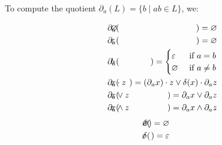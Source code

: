 \documentclass[sigplan,review,acmsmall,nonacm,screen,anonymous]{acmart}\settopmatter{printfolios=false,printccs=false,printacmref=false}
\begin{document}
\begin{definition}[Brzozowski, 1964]
  To compute the quotient \(\partial_a(L) = \{b \mid ab \in L\}\), we:

  \vspace{-0.8cm}
  \begin{multicols}{2}
    \begin{eqnarray*}
      \phantom{--}\partial_a(&\hspace{-0.35cm} \varnothing \hspace{-0.35cm}&) = \varnothing                                           \\
      \phantom{--}\partial_a(&\hspace{-0.35cm} \varepsilon \hspace{-0.35cm}&) = \varnothing                                           \\
      \phantom{--}\partial_a(&\hspace{-0.35cm} b           \hspace{-0.35cm}&) = \begin{cases}\varepsilon &\text{ if } a = b\\ \varnothing &\text{ if } a \neq b \end{cases}\\
      \phantom{--}\partial_a(&\hspace{-0.35cm} x\cdot z    \hspace{-0.35cm}&) = (\partial_a x)\cdot z \vee \delta(x)\cdot\partial_a z \\
      \phantom{--}\partial_a(&\hspace{-0.35cm} x\vee  z    \hspace{-0.35cm}&) =  \partial_a x \vee  \partial_a z                       \\
      \phantom{--}\partial_a(&\hspace{-0.35cm} x\land z    \hspace{-0.35cm}&) =  \partial_a x \land \partial_a z
    \end{eqnarray*} \break\vspace{-0.45cm}
    \begin{eqnarray*}
      \delta(&\hspace{-0.35cm} \varnothing \hspace{-0.35cm}&) = \varnothing                                      \\
      \delta(&\hspace{-0.35cm} \varepsilon \hspace{-0.35cm}&) = \varepsilon                                      \\

\end{eqnarray*}
\end{multicols}
\end{definition}
\end{document}
